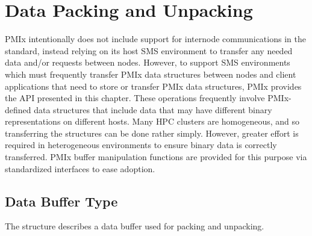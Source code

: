 \chapter{Data Packing and Unpacking}
\label{chap:api_data_mgmt}

\ac{PMIx} intentionally does not include support for internode communications in the standard, instead relying on its host \ac{SMS} environment to transfer any needed data and/or requests between nodes.  However, to support \ac{SMS} environments which must frequently transfer \ac{PMIx} data structures between nodes and client applications that need to store or transfer \ac{PMIx} data structures, \ac{PMIx} provides the \acs{API} presented in this chapter. These operations frequently involve PMIx-defined data structures that include data that may have different binary representations on different hosts. Many \ac{HPC} clusters are homogeneous, and so transferring the structures can be done rather simply. However, greater effort is required in heterogeneous environments to ensure binary data is correctly transferred. \ac{PMIx} buffer manipulation functions are provided for this purpose via standardized interfaces to ease adoption.

\section{Data Buffer Type}

The  structure describes a data buffer used for packing and unpacking.

